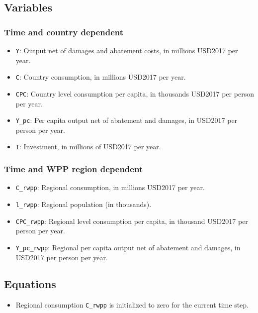 \documentclass[
]{article}
\providecommand{\tightlist}{%
  \setlength{\itemsep}{0pt}\setlength{\parskip}{0pt}}
\begin{document}
\subsection{Variables}\label{variables-4}

\subsubsection{Time and country
dependent}\label{time-and-country-dependent-9}

\begin{itemize}
\item
  \texttt{Y}: Output net of damages and abatement costs, in millions
  USD2017 per year.
\item
  \texttt{C}: Country consumption, in millions USD2017 per year.
\item
  \texttt{CPC}: Country level consumption per capita, in thousands USD2017 per person per year.
\item
  \texttt{Y\_pc}: Per capita output net of abatement and damages, in
  USD2017 per person per year.
\item
  \texttt{I}: Investment, in millions of
   USD2017 per year.
\end{itemize}

\subsubsection{Time and WPP region dependent}\label{time-and-region-dependent}

\begin{itemize}
\tightlist
\item
  \texttt{C\_rwpp}: Regional consumption, in millions USD2017 per year.
\item
  \texttt{l\_rwpp}: Regional population (in thousands).
\item
  \texttt{CPC\_rwpp}: Regional level consumption per capita, in thousand
  USD2017 per person per year.
\item
  \texttt{Y\_pc\_rwpp}: Regional per capita output net of abatement and
  damages, in USD2017 per person per year.
\end{itemize}

\subsection{Equations}\label{equations-4}

\begin{itemize}
\tightlist
\item
  Regional consumption \texttt{C\_rwpp} is initialized to zero for the
  current time step.
\end{itemize}
\end{document}
